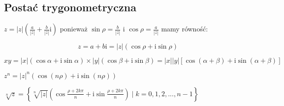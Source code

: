 \documentclass[a5paper,8pt]{extarticle}
\newcommand{\mi}{\mathrm{i}}
\begin{document}
\subsection{Postać trygonometryczna}

$ z = |z|\left( \frac{a}{|z|} + \frac{b}{|z|}\mi \right) $ ponieważ $ \sin\rho = \frac{b}{|z|} $ i $ \cos\rho = \frac{a}{|z|} $ mamy równość:

$$ z = a + b\mi = |z|(\cos\rho + \mi\sin\rho) $$

\begin{description}

\item $ xy = |x|(\cos \alpha + \mi\sin\alpha) \times |y|(\cos \beta + \mi\sin\beta) =
	|x||y|\left[\cos(\alpha + \beta) + \mi\sin(\alpha+\beta)\right]$

\item[Wzór de Moivre'a] $ z^n = |z|^n\left(\cos(n\rho) + \mi\sin(n\rho)\right) $

\item[Pierwiastki] $ \sqrt[n]{ z } = \left\{ \sqrt[n]{|z|} \left(\cos \frac{\rho + 2k\pi}{n} + \mi\sin \frac{\rho + 2k\pi}{n} \right) \mid k = 0, 1, 2, ..., n-1  \right\} $

\end{description}
\end{document}
